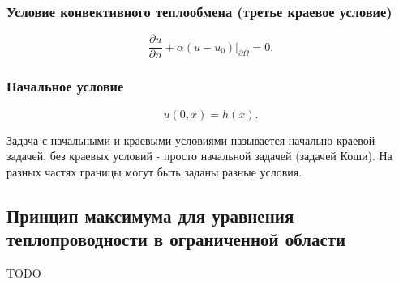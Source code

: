 \subsubsection{Условие конвективного теплообмена (третье краевое условие)}
$$ \frac {\partial u} {\partial n} + \alpha (u - u_0) \Bigg\rvert_{\partial \Omega} = 0.$$

\subsubsection{Начальное условие}
$$ u(0, x) = h(x).$$



Задача с начальными и краевыми условиями называется начально-краевой задачей, без краевых условий - просто начальной задачей (задачей Коши). На разных частях границы могут быть заданы разные условия.

\subsection{Принцип максимума для уравнения теплопроводности в ограниченной области}
TODO